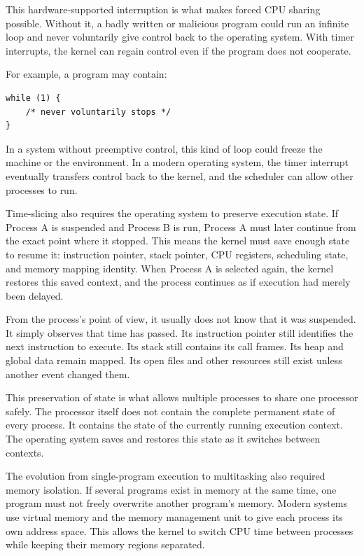 This hardware-supported interruption is what makes forced CPU sharing possible. Without it, a badly written or malicious program could run an infinite loop and never voluntarily give control back to the operating system. With timer interrupts, the kernel can regain control even if the program does not cooperate.

For example, a program may contain:

\begin{verbatim}
while (1) {
    /* never voluntarily stops */
}
\end{verbatim}

In a system without preemptive control, this kind of loop could freeze the machine or the environment. In a modern operating system, the timer interrupt eventually transfers control back to the kernel, and the scheduler can allow other processes to run.

Time-slicing also requires the operating system to preserve execution state. If Process A is suspended and Process B is run, Process A must later continue from the exact point where it stopped. This means the kernel must save enough state to resume it: instruction pointer, stack pointer, CPU registers, scheduling state, and memory mapping identity. When Process A is selected again, the kernel restores this saved context, and the process continues as if execution had merely been delayed.

From the process's point of view, it usually does not know that it was suspended. It simply observes that time has passed. Its instruction pointer still identifies the next instruction to execute. Its stack still contains its call frames. Its heap and global data remain mapped. Its open files and other resources still exist unless another event changed them.

This preservation of state is what allows multiple processes to share one processor safely. The processor itself does not contain the complete permanent state of every process. It contains the state of the currently running execution context. The operating system saves and restores this state as it switches between contexts.

The evolution from single-program execution to multitasking also required memory isolation. If several programs exist in memory at the same time, one program must not freely overwrite another program's memory. Modern systems use virtual memory and the memory management unit to give each process its own address space. This allows the kernel to switch CPU time between processes while keeping their memory regions separated.

